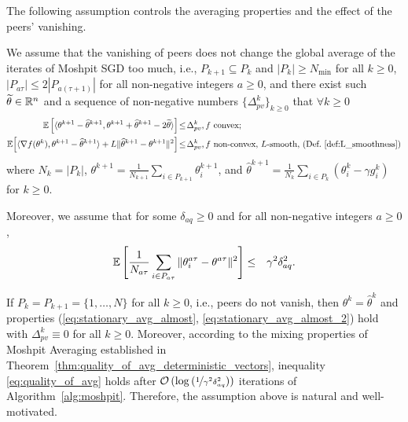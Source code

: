 The following assumption controls the averaging properties and the effect of the peers' vanishing.
\begin{assumption}\label{as:averaging_quality}
    We assume that the vanishing of peers does not change the global average of the iterates of Moshpit SGD too much, i.e., $P_{k+1}\subseteq P_{k}$ and $|P_k| \ge N_{\min}$ for all $k\ge 0$, $|P_{a\tau}| \le 2|P_{a(\tau+1)}|$ for all non-negative integers $a\ge 0$, and there exist such $\widetilde{\theta}\in \mathbb{R}^n$ and a sequence of non-negative numbers $\{\Delta_{pv}^k\}_{k\ge 0}$ that $\forall k \ge 0$
    \begin{align}
        \mathbb{E}\left[\langle\theta^{k+1} - \widehat{\theta}^{k+1}, \theta^{k+1}+\widehat{\theta}^{k+1} - 2\widetilde\theta\rangle\right] \!\le\! \Delta_{pv}^k\label{eq:stationary_avg_almost}&,f\text{ convex;}\\
        \mathbb{E}\!\left[\langle\nabla f(\theta^k), \theta^{k+1}-\widehat{\theta}^{k+1}\rangle + L\|\widehat{\theta}^{k+1} - \theta^{k+1}\|^2\right] \!\le\! \Delta_{pv}^k\label{eq:stationary_avg_almost_2}&,f\text{ non-convex, $L$-smooth, (Def.~\ref{def:L_smoothness})}
    \end{align}
    where $N_k = |P_k|$, $\theta^{k+1} = \frac{1}{N_{k+1}}\sum_{i\in P_{k+1}}\theta_i^{k+1}$, and $\widehat \theta^{k+1} = \frac{1}{N_{k}}\sum_{i\in P_{k}}(\theta_i^{k}-\gamma g_i^k)$ for $k\ge 0$. 
    
    Moreover, we assume that for some $\delta_{aq} \ge 0$ and for all non-negative integers $a\ge 0$,
    \begin{eqnarray}
        \mathbb{E}\left[\frac{1}{N_{a\tau}}\sum\limits_{i\in P_{a\tau}}\|\theta_i^{a\tau} - \theta^{a\tau}\|^2\right] &\le& \gamma^2\delta_{aq}^2.\label{eq:quality_of_avg}
    \end{eqnarray}
\end{assumption}
If $P_k = P_{k+1} = \{1,\ldots,N\}$ for all $k\ge 0$, i.e., peers do not vanish, then $\theta^{k} = \widehat{\theta}^{k}$ and properties (\ref{eq:stationary_avg_almost}, \ref{eq:stationary_avg_almost_2}) hold with $\Delta_{pv}^k \equiv 0$ for all $k\ge 0$. Moreover, according to the mixing properties of Moshpit Averaging established in Theorem~\ref{thm:quality_of_avg_deterministic_vectors}, inequality \ref{eq:quality_of_avg} holds after ${\cal O}\left(\log\left(\nicefrac{1}{\gamma^2\delta_{aq}^2}\right)\right)$ iterations of Algorithm~\ref{alg:moshpit}. Therefore, the assumption above is natural and well-motivated.

